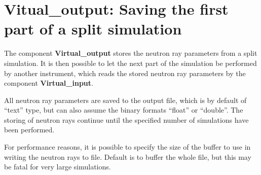 \section{Vitual\_output: Saving the first part of a split simulation}
\label{virtual_output}


The component {\bf Virtual\_output} stores the neutron ray parameters
from a split simulation. It is then possible to let the 
next part of the simulation be performed by another instrument,
which reads the stored neutron ray
parameters by the component {\bf Virtual\_input}.

All neutron ray parameters are saved to the output file, which is by default
of ``text'' type, but can also assume the binary formats 
``float'' or ``double''. The storing of neutron rays continue until the 
specified number of simulations have been performed.

For performance reasons, it is possible to specify the size of 
the buffer to use in writing the neutron rays to file. Default 
is to buffer the whole file, but this may be fatal for very large
simulations.
